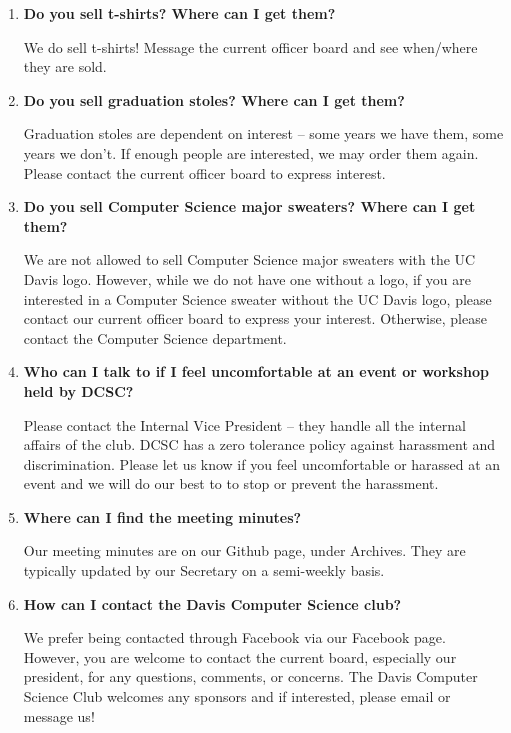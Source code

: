 \documentclass{article}
\begin{document}
\begin{enumerate}
    \item \textbf{Do you sell t-shirts? Where can I get them?}
    \begin{itemize}
        We do sell t-shirts! Message the current officer board and see when/where they are sold. 
    \end{itemize}
    \item \textbf{Do you sell graduation stoles? Where can I get them?}
    \begin{itemize}
        Graduation stoles are dependent on interest -- some years we have them, some years we don't. If enough people are interested, we may order them again. Please contact the current officer board to express interest.
    \end{itemize}
    \item \textbf{Do you sell Computer Science major sweaters? Where can I get them?}
    \begin{itemize}
        We are not allowed to sell Computer Science major sweaters with the UC Davis logo. However, while we do not have one without a logo, if you are interested in a Computer Science sweater without the UC Davis logo, please contact our current officer board to express your interest. Otherwise, please contact the Computer Science department.
    \end{itemize}
    \item \textbf{Who can I talk to if I feel uncomfortable at an event or workshop held by DCSC?}
    \begin{itemize}
        Please contact the Internal Vice President -- they handle all the internal affairs of the club. DCSC has a zero tolerance policy against harassment and discrimination. Please let us know if you feel uncomfortable or harassed at an event and we will do our best to to stop or prevent the harassment. 
    \end{itemize}
    \item \textbf{Where can I find the meeting minutes?}
    \begin{itemize}
        Our meeting minutes are on our Github page, under Archives. They are typically updated by our Secretary on a semi-weekly basis. 
    \end{itemize}
    \item \textbf{How can I contact the Davis Computer Science club?}
    \begin{itemize}
        We prefer being contacted through Facebook via our Facebook page. However, you are welcome to contact the current board, especially our president, for any questions, comments, or concerns. The Davis Computer Science Club welcomes any sponsors and if interested, please email or message us! 
    \end{itemize}
\end{enumerate}
\newpage
\end{document}
